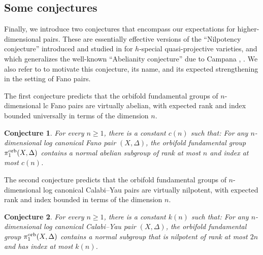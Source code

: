 \documentclass{amsart}
\newtheorem{introcon}{Conjecture}
\theoremstyle{definition}
\theoremstyle{remark}
\numberwithin{equation}{section}
\begin{document}
\subsection{Some conjectures}

Finally, we introduce two conjectures that encompass our expectations for higher-dimensional pairs. These are essentially effective versions of the ``Nilpotency conjecture'' introduced and studied in \cite[Conjecture 1.14]{CDY22} for $h$-special quasi-projective varieties, and which generalizes the well-known ``Abelianity conjecture'' due to Campana \cite[Conjecture 13.10.(2)]{Cam11}, \cite[11.2]{Cam11bis}. We also refer to \cite[Conjecture 23, Example 24]{AC23} to motivate this conjecture, its name, and its expected strengthening in the setting of Fano pairs.

The first conjecture predicts that the orbifold fundamental groups of $n$-dimensional lc Fano pairs are virtually abelian, with expected rank and index bounded universally in terms of the dimension $n$.

\begin{introcon}
\label{conj:lc-Fano}
For every $n\ge 1$, there is a constant $c(n)$ such that: For any $n$-dimensional log canonical Fano pair $(X,\Delta)$, the orbifold fundamental group $\pi_1^{\rm orb}(X,\Delta)$ contains a normal abelian subgroup of rank at most $n$ and index at most $c(n)$.
\end{introcon}

The second conjecture predicts that the orbifold fundamental groups of $n$-dimensional log canonical Calabi--Yau pairs are virtually nilpotent, with expected rank and index bounded in terms of the dimension $n$.

\begin{introcon}\label{conj:lc-CY}
For every $n\ge 1$, there is a constant $k(n)$ such that: For any $n$-dimensional log canonical Calabi--Yau pair $(X,\Delta)$, the orbifold fundamental group $\pi_1^{\rm orb}(X,\Delta)$ contains a normal subgroup that is nilpotent of rank at most $2n$ and has index at most $k(n)$.
\end{introcon}

\end{document}
